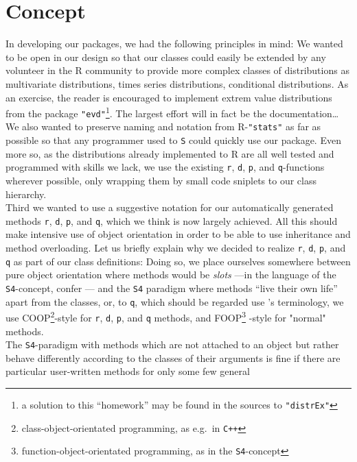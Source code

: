 \documentclass[11pt]{article}
\newcommand{\code}[1]{{\tt #1}}
\newcommand{\pkg}[1]{{\tt "#1"}}
\begin{document}
\section{Concept}
In developing our packages, we had the following principles in mind:
We wanted to be open in our design so that our classes could easily be extended
by any volunteer in the {\sf R} community to provide more complex classes of
distributions as multivariate distributions, times series distributions,
conditional distributions. As an exercise, the reader is encouraged to implement
extrem value  distributions from the package \pkg{evd}\footnote{a solution to
this ``homework''  may be found in the sources to \pkg{distrEx}}. The largest
effort will in fact be the documentation\ldots\\
We also wanted to preserve naming and notation from {\sf R}-\pkg{stats}
as far as possible so that any programmer used to {\tt S} could quickly
use our package. Even more so, as the distributions already implemented to
{\sf R} are all well tested and programmed with skills we lack, we use the
existing {\tt r}, {\tt d}, {\tt p}, and {\tt q}-functions wherever possible,
only wrapping them by small code sniplets to our class hierarchy.\\
Third we wanted to use a suggestive notation for our automatically generated
methods \code{r}, \code{d}, \code{p}, and \code{q}, which we think is now
largely achieved. All this should make intensive use of object orientation in
order to be able to use inheritance and method overloading.
Let us briefly explain why we decided to realize \code{r}, \code{d},
\code{p}, and \code{q} as part of our class definitions:
Doing so, we place ourselves somewhere between
pure object orientation where methods would be {\it slots\/} ---in the language
of the {\tt S4}-concept, confer \cite{Cham:98}--- and the {\tt S4} paradigm
where methods ``live their own life'' apart from the classes, or, to \code{q},
which should be regarded use \cite{Beng:03}'s terminology, we use
COOP\footnote{class-object-orientated
programming, as e.g.\ in {\tt C++}}-style for \code{r}, \code{d}, \code{p}, and
\code{q} methods, and FOOP\footnote{function-object-orientated programming,
as in the {\tt S4}-concept} -style for "normal" methods.\\
The {\tt S4}-paradigm with methods which are not attached to an object but
rather behave differently according to the classes of their arguments is fine
if there are particular user-written methods for only some few general
\end{document}
